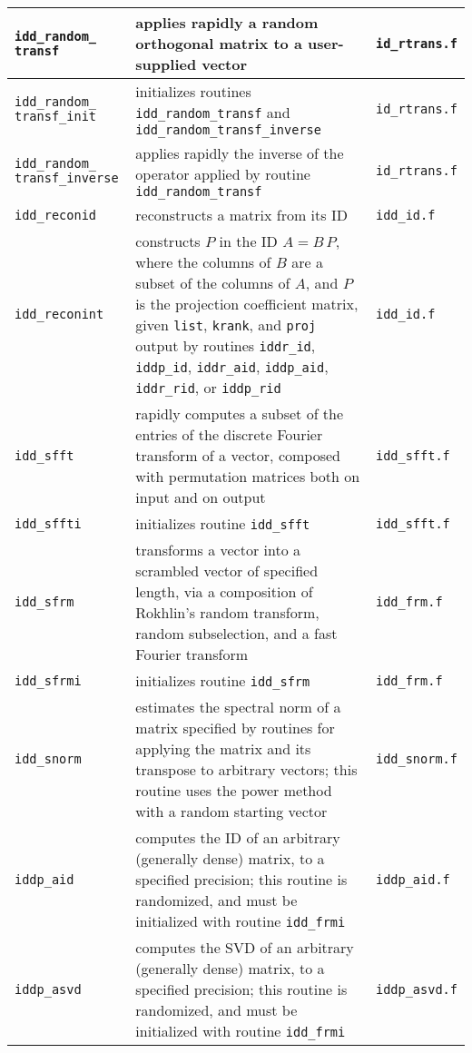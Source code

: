 ﻿\documentclass[letterpaper,12pt]{article}
\begin{document}
\begin{center}
\begin{supertabular}{>{\raggedright}p{1.2in} p{.53\textwidth} l}
%
{\tt idd\_random\_} {\tt transf} & applies rapidly a
random orthogonal matrix to a user-supplied vector & {\tt id\_rtrans.f}
\\\hline
%
{\tt idd\_random\_ transf\_init} & \raggedright initializes routines
{\tt idd\_random\_transf} and {\tt idd\_random\_transf\_inverse} &
{\tt id\_rtrans.f} \\\hline
%
{\tt idd\_random\_} {\tt transf\_inverse} & applies
rapidly the inverse of the operator applied by routine
{\tt idd\_random\_transf} & {\tt id\_rtrans.f} \\\hline
%
{\tt idd\_reconid} & reconstructs a matrix from its ID &
{\tt idd\_id.f} \\\hline
%
{\tt idd\_reconint} & constructs $P$ in the ID $A = B \, P$, where the
columns of $B$ are a subset of the columns of $A$, and $P$ is the
projection coefficient matrix, given {\tt list}, {\tt krank}, and
{\tt proj} output by routines {\tt iddr\_id}, {\tt iddp\_id},
{\tt iddr\_aid}, {\tt iddp\_aid}, {\tt iddr\_rid}, or {\tt iddp\_rid} &
{\tt idd\_id.f} \\\hline
%
{\tt idd\_sfft} & rapidly computes a subset of the entries of the
discrete Fourier transform of a vector, composed with permutation
matrices both on input and on output & {\tt idd\_sfft.f} \\\hline
%
{\tt idd\_sffti} & initializes routine {\tt idd\_sfft} &
{\tt idd\_sfft.f} \\\hline
%
{\tt idd\_sfrm} & transforms a vector into a scrambled vector of
specified length, via a composition of Rokhlin's random transform,
random subselection, and a fast Fourier transform & {\tt idd\_frm.f}
\\\hline
%
{\tt idd\_sfrmi} & initializes routine {\tt idd\_sfrm} &
{\tt idd\_frm.f} \\\hline
%
{\tt idd\_snorm} & estimates the spectral norm of a matrix specified by
routines for applying the matrix and its transpose to arbitrary
vectors; this routine uses the power method with a random starting
vector & {\tt idd\_snorm.f} \\\hline
%
{\tt iddp\_aid} & computes the ID of an arbitrary (generally dense)
matrix, to a specified precision; this routine is randomized, and must
be initialized with routine {\tt idd\_frmi} & {\tt iddp\_aid.f}
\\\hline
%
{\tt iddp\_asvd} & computes the SVD of an arbitrary (generally dense)
matrix, to a specified precision; this routine is randomized, and must
be initialized with routine {\tt idd\_frmi} & {\tt iddp\_asvd.f}

\end{supertabular}
\end{center}
\end{document}
